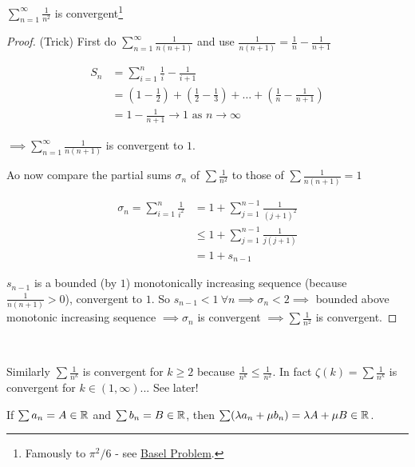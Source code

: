 \begin{example}
$\displaystyle{\sum_{n=1}^{\infty} \frac{1}{n^2}}$ is convergent\footnote{Famously to $\pi^2/6$ - see \href{https://en.wikipedia.org/wiki/Basel_problem}{Basel Problem}.} 	

\begin{proof}(Trick) First do $\sum_{n=1}^\infty \frac{1}{n(n+1)}$ and use $\frac{1}{n(n+1)} = \frac{1}{n} - \frac{1}{n+1}$

\[\begin{aligned}
S_n &= \sum_{i=1}^n \frac{1}{i} - \frac{1}{i+1} \\
&= \textstyle{(1-\frac{1}{2}) + (\frac{1}{2} - \frac{1}{3}) + \dots + (\frac{1}{n} - \frac{1}{n+1})}\\
&= 1 - \frac{1}{n+1} \to 1 \text{ as } n \to \infty	
\end{aligned}
\]

$\implies \sum_{n=1}^\infty \frac{1}{n(n+1)}$ is convergent to $1$.

Ao now compare the partial sums $\sigma_n$ of $\sum \frac{1}{n^2}$ to those of $\sum \frac{1}{n(n+1)} = 1$

\[\begin{aligned}
\sigma_n = \sum_{i=1}^n \frac{1}{i^2} &= 1 + \sum_{j=1}^{n-1} \frac{1}{(j+1)^2} \\
&\leq 1 + \sum_{j=1}^{n-1}\frac{1}{j(j+1)}\\
&= 1 + s_{n-1}	
\end{aligned}
\]

$s_{n-1}$ is a bounded (by $1$) monotonically increasing sequence (because $\frac{1}{n(n+1)} >0$), convergent to $1$. So $s_{n-1} < 1~\forall n \implies \sigma_n < 2 \implies$ bounded above monotonic increasing sequence $\implies \sigma_n$ is convergent $\implies \sum \frac{1}{n^2}$ is convergent.	
\end{proof}
\end{example}~


Similarly $\sum \frac{1}{n^k}$ is convergent for $k \geq 2$ because $\frac{1}{n^k} \leq \frac{1}{n^2}$. In fact $\zeta(k) = \sum \frac{1}{n^k}$ is convergent for $k \in (1,\infty)$... See later!\\


\begin{theorem}

If $\sum a_n = A \in\mathbb{R}$ and $\sum b_n = B \in\mathbb{R}$, then $\sum (\lambda a_n + \mu b_n) = \lambda A + \mu B \in\mathbb{R}$. 
\end{theorem}

